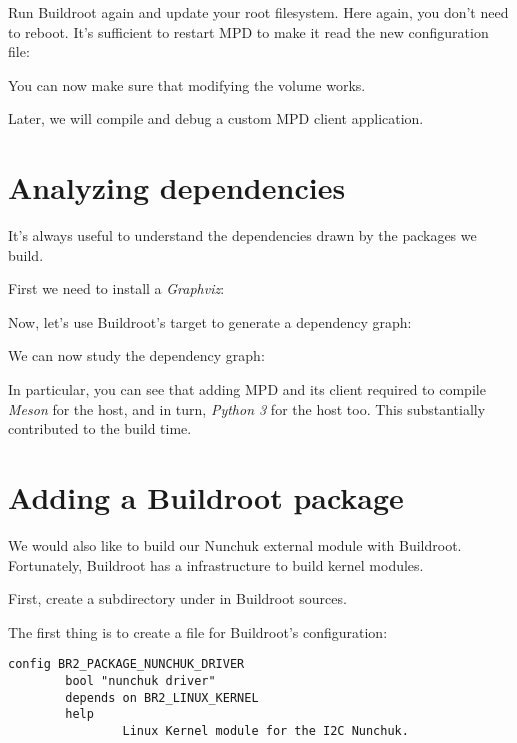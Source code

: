 Run Buildroot again and update your root filesystem. Here again, you
don't need to reboot. It's sufficient to restart MPD to make it read
the new configuration file:


You can now make sure that modifying the volume works.

Later, we will compile and debug a custom MPD client application.

\section{Analyzing dependencies}

It's always useful to understand the dependencies drawn by the
packages we build.

First we need to install a {\em Graphviz}:


Now, let's use Buildroot's target to generate a
dependency graph:


We can now study the dependency graph:


In particular, you can see that adding MPD and its client
required to compile {\em Meson} for the host, and in turn,
{\em Python 3} for the host too. This substantially contributed to the
build time.

\section{Adding a Buildroot package}

We would also like to build our Nunchuk external module with Buildroot.
Fortunately, Buildroot has a  infrastructure
to build kernel modules.

First, create a  subdirectory under 
in Buildroot sources.

The first thing is to create a  file
for Buildroot's configuration:

\begin{verbatim}
config BR2_PACKAGE_NUNCHUK_DRIVER
        bool "nunchuk driver"
        depends on BR2_LINUX_KERNEL
        help
                Linux Kernel module for the I2C Nunchuk.
\end{verbatim}


